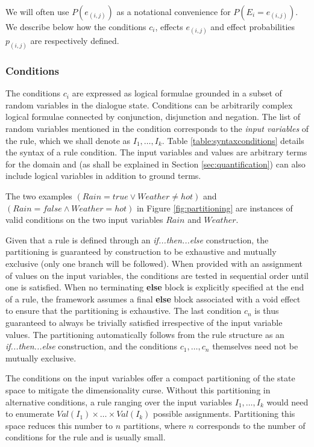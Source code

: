 We will often use $P(e_{(i,j)})$ as a notational convenience for $P(E_i = e_{(i,j)})$.   We describe below how the conditions $c_i$, effects $e_{(i,j)}$ and effect probabilities $p_{(i,j)}$ are respectively defined. 

\subsubsection*{Conditions}

The conditions $c_i$ are expressed as logical formulae grounded in a subset of random variables in the dialogue state. Conditions can be arbitrarily complex logical formulae connected by conjunction, disjunction and negation.  The list of random variables mentioned in the condition corresponds to the \textit{input variables} of the rule, which we shall denote as $I_1, \dots, I_{k}$. Table \ref{table:syntaxconditions} details the syntax of a rule condition.  The input variables and values are arbitrary terms for the domain and (as shall be explained in Section \ref{sec:quantification}) can also include logical variables in addition to ground terms. 

The two examples $(\mathit{Rain}\!=\mathit{true} \lor \mathit{Weather}\!\neq\mathit{hot})$ and $(\mathit{Rain}\!=\mathit{false} \land \mathit{Weather}\!=\mathit{hot})$ in Figure \ref{fig:partitioning} are instances of valid conditions on the two input variables $Rain$ and $\mathit{Weather}$. 

Given that a rule is defined through an \textit{if...then...else} construction, the partitioning is guaranteed by construction to be exhaustive and mutually exclusive (only one branch will be followed).  When provided with an assignment of values on the input variables, the conditions are tested in sequential order until one is satisfied. When no terminating \textbf{else} block is explicitly specified at the end of a rule, the framework assumes a final \textbf{else} block associated with a void effect to ensure that the partitioning is exhaustive. The last condition $c_n$ is thus guaranteed to always be trivially satisfied irrespective of the input variable values. The partitioning automatically follows from the rule structure as an \textit{if...then...else} construction, and the conditions $c_1,\dots, c_n$ themselves need not be mutually exclusive. 

The conditions on the input variables offer a compact partitioning of the state space to mitigate the dimensionality curse.  Without this partitioning in alternative conditions, a rule ranging over the input variables $I_1, \dots, I_{k}$ would need to enumerate $\mathit{Val}(I_1) \times \dots \times \mathit{Val}(I_k)$ possible assignments.  Partitioning this space reduces this number to $n$ partitions, where $n$ corresponds to the number of conditions for the rule and is usually small. 



